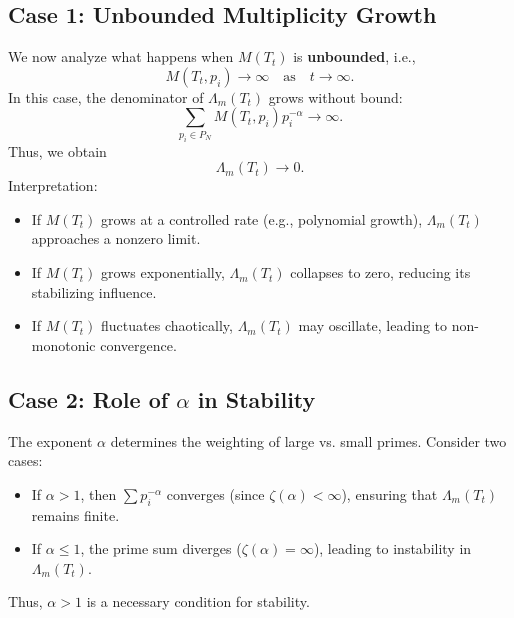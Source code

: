 \documentclass{article}
\theoremstyle{plain}
\begin{document}
\subsection{Case 1: Unbounded Multiplicity Growth}
We now analyze what happens when \( M(T_t) \) is \textbf{unbounded}, i.e.,
\begin{equation}
    M(T_t, p_i) \to \infty \quad \text{as} \quad t \to \infty.
\end{equation}
In this case, the denominator of \( \Lambda_m(T_t) \) grows without bound:
\begin{equation}
    \sum_{p_i \in P_N} M(T_t, p_i) p_i^{-\alpha} \to \infty.
\end{equation}
Thus, we obtain
\begin{equation}
    \Lambda_m(T_t) \to 0.
\end{equation}
Interpretation:
\begin{itemize}
    \item If \( M(T_t) \) grows at a controlled rate (e.g., polynomial growth), \( \Lambda_m(T_t) \) approaches a nonzero limit.
    \item If \( M(T_t) \) grows exponentially, \( \Lambda_m(T_t) \) collapses to zero, reducing its stabilizing influence.
    \item If \( M(T_t) \) fluctuates chaotically, \( \Lambda_m(T_t) \) may oscillate, leading to non-monotonic convergence.
\end{itemize}

\subsection{Case 2: Role of \( \alpha \) in Stability}
The exponent \( \alpha \) determines the weighting of large vs. small primes. Consider two cases:
\begin{itemize}
    \item If \( \alpha > 1 \), then \( \sum p_i^{-\alpha} \) converges (since \( \zeta(\alpha) < \infty \)), ensuring that \( \Lambda_m(T_t) \) remains finite.
    \item If \( \alpha \leq 1 \), the prime sum diverges (\( \zeta(\alpha) = \infty \)), leading to instability in \( \Lambda_m(T_t) \).
\end{itemize}
Thus, \( \alpha > 1 \) is a necessary condition for stability.
\end{document}
